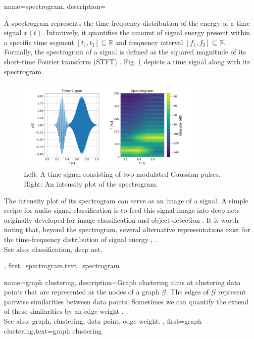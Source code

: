 {name={spectrogram},
	description={
		A spectrogram represents the time-frequency distribution of the energy of a time signal $x(t)$.  
		Intuitively, it quantifies the amount of signal energy present within a specific time segment 
		$[t_{1},t_{2}] \subseteq \mathbb{R}$ and frequency interval $[f_{1},f_{2}]\subseteq \mathbb{R}$. 
		Formally, the spectrogram of a signal is defined as the squared magnitude of its 
		short-time Fourier transform (STFT) \cite{cohen1995time}.
        Fig. \ref{fig:spectrogram_dict} depicts a time signal along with its spectrogram. 
	\begin{figure}[H]
		\centering
		\includegraphics[width=0.8\textwidth]{assets/spectrogram.png}
		\caption{Left: A time signal consisting of two modulated Gaussian pulses. Right: An intensity 
		plot of the spectrogram.
		\label{fig:spectrogram_dict}}
	\end{figure}
        The intensity plot of its spectrogram can serve as an image of a signal. A 
		simple recipe for audio signal classification is to feed this signal image 
		into deep nets originally developed for image classification and object detection \cite{Li:2022aa}. 
		It is worth noting that, beyond the spectrogram, several alternative representations exist 
		for the time-frequency distribution of signal energy \cite{TimeFrequencyAnalysisBoashash}, \cite{MallatBook}.
					\\ 
		See also: classification, deep net.
		}, 
	first={spectrogram},text={spectrogram} 
}

{name={graph clustering},
	description={Graph clustering aims at 
		clustering data points that are represented as the nodes 
		of a graph $\mathcal{G}$. The edges of $\mathcal{G}$ represent 
		pairwise similarities between data points. Sometimes we
		can quantify the extend of these similarities by an edge weight \cite{FlowSpecClustering2021}, \cite{Luxburg2007}.
					\\ 
		See also: graph, clustering, data point, edge weight. }, 
	first={graph clustering},text={graph clustering} 
}

